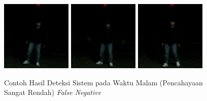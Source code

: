\begin{figure} [h]
    \centering
    \includegraphics[width=0.3\textwidth]{gambar/sistem_gelap/problem/gelap_helmika_ver2 (19).png}
    \includegraphics[width=0.3\textwidth]{gambar/sistem_gelap/problem/gelap_helmika_ver2 (26).png}
    \includegraphics[width=0.3\textwidth]{gambar/sistem_gelap/problem/gelap_helmika_ver2 (33).png}
    \caption{Contoh Hasil Deteksi Sistem pada Waktu Malam (Pencahayaan Sangat Rendah) \emph{False Negative}}
    \label{fig:sys_lowilu_malam_problem}  
\end{figure}